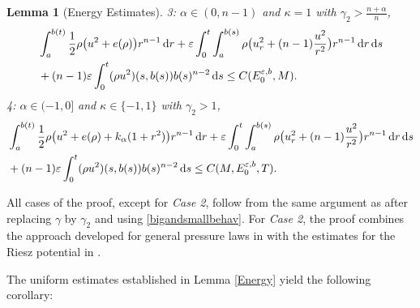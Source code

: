 \documentclass[reqno,11pt]{amsart}
\numberwithin{equation}{section}
\newtheorem{lemma}[theorem]{Lemma}
\theoremstyle{definition}
\def\dd{{\, \rm d}}
\begin{document}
\begin{lemma}[Energy Estimates]
\smallskip    
{} {\rm 3:} $\alpha \in (0,n-1)$ and $\kappa = 1$ with $\gamma_2 > \frac{n + \alpha}{n}$,
    \begin{align*}
    \begin{split}
    &\int^{b(t)}_a \frac{1}{2} \rho \big(u^2 + e(\rho) \big)r^{n-1} \dd r 
     + \varepsilon \int^t_0\int^{b(s)}_a \rho \big(u_r^2 + (n-1)\frac{u^2}{r^2} \big) r^{n-1} \dd r\dd s \\ 
     & + (n-1)\varepsilon\int^t_0 (\rho u^2)(s,b(s))b(s)^{n-2} \dd s \leq C(E^{\varepsilon,b}_0,M).
     \end{split}
    \end{align*}
\smallskip 
{} {\rm 4:} $\alpha \in (-1,0]$ and $\kappa \in \{ -1, 1 \}$ with $\gamma_2 > 1$,
\begin{align*}
\begin{split}
&\int^{b(t)}_a \frac{1}{2} \rho \big(u^2 + e(\rho) + k_\alpha(1+r^2) \big)r^{n-1} \dd r 
+ \varepsilon \int^t_0\int^{b(s)}_a \rho \big(u_r^2 + (n-1)\frac{u^2}{r^2} \big) r^{n-1} \dd r\dd s \\ 
& + (n-1)\varepsilon\int^t_0 (\rho u^2)(s,b(s))b(s)^{n-2} \dd s \leq C(M,E_0^{\varepsilon,b},T).
\end{split}
\end{align*}
\end{lemma}

All cases of the proof, except for {\it Case 2}, follow from the same argument 
as \cite[Lemma 3.4]{Carrillo2025} after replacing $\gamma$ by $\gamma_2$ and 
using \eqref{bigandsmallbehav}. 
For {\it Case 2}, the proof combines the approach developed for general pressure laws 
in \cite[Lemma 5.1]{Chen_2024} with the estimates for the Riesz potential 
in \cite[Lemma 3.4]{Carrillo2025}. 

\smallskip
The uniform estimates established in Lemma \ref{Energy} yield the following corollary:
\end{document}
